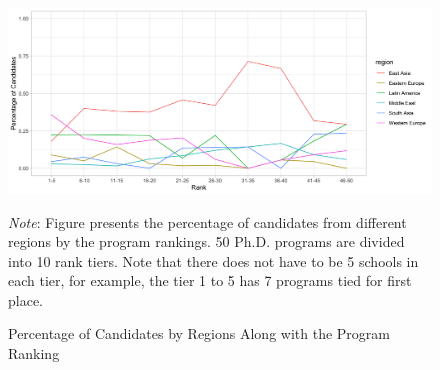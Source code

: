 \begin{figure}[H]
    \begin{center}
    \caption{Percentage of Candidates by Regions Along with the Program Ranking}
    \includegraphics[width=140mm, scale=0.5]{fig/figure3.png}
    \end{center}
	\label{fig:figure1}
        \vspace{0.3cm}
    \begin{minipage}{0.95\textwidth} 
	{\footnotesize \textit{Note}: Figure presents the percentage of candidates from different regions by the program rankings. 50 Ph.D. programs are divided into 10 rank tiers. Note that there does not have to be 5 schools in each tier, for example, the tier 1 to 5 has 7 programs tied for first place.
	\par
	}
	\end{minipage}
\end{figure}


